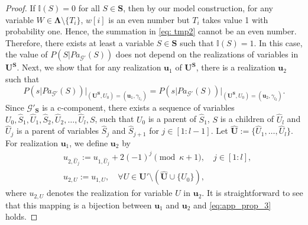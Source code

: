 \documentclass[accepted]{uai2022}
\newcommand{\Pa}[2]{\textit{Pa}_{#2}(#1)}
\newcommand{\U}[0]{\mathbf{U}}
\newcommand{\G}[0]{\mathcal{G}}
\begin{document}
\begin{proof}
        If $\mathbb{I}(S)=0$ for all $S \in \mathbf{S}$, then by our model construction, for any variable $W \in \mathbf{\Lambda}\setminus \{T_i\}$, $w[i]$ is an even number but $T_i$ takes value 1 with probability one. 
        Hence, the summation in \eqref{eq: tmp2} cannot be an even number.
        Therefore, there exists at least a variable $S\in \mathbf{S}$ such that $\mathbb{I}(S)=1$. 
        In this case, the value of $P(S|\Pa{S}{\G'})$ does not depend on the realizations of variables in $\U^{\mathbf{S}}$. 
        Next, we show that for any realization $\mathbf{u}_{1}$ of $\U^{\mathbf{S}}$, there is a realization $\mathbf{u}_{2}$ such that 
        \begin{equation}\label{eq:app_prop_3}
        P(s|\Pa{S}{\G'})\Big|_{(\U^{\mathbf{S}},U_0)=(\textbf{u}_1,\gamma_{l_1})}=P(s|\Pa{S}{\G'})\Big|_{(\U^{\mathbf{S}},U_0)=(\textbf{u}_2,\gamma_{l_2})}.
        \end{equation}
        Since $\G'_{\mathbf{S}}$ is a c-component, there exists a sequence of variables $U_0, \hat{S}_1, \hat{U}_1, \hat{S}_2, \hat{U}_2, \dots, \hat{U}_l, S$, such that $U_0$ is a parent of $\hat{S}_1$, $S$ is a children of $\hat{U}_l$ and $\hat{U}_j$ is a parent of variables $\hat{S}_j$ and $\hat{S}_{j+1}$ for $j \in [1:l-1]$. 
        Let $\hat{\U}:=\{\hat{U}_1, \dots, \hat{U}_l\}$. 
        For realization $\mathbf{u}_{1}$, we define $\mathbf{u}_{2}$ by
        \begin{equation}
            \begin{split}
                & u_{2,\hat{U}_j} := u_{1,\hat{U}_j} + 2(-1)^{j} \pmod{\kappa+1}, \quad j\in[1:l],\\
                & u_{2,U} := u_{1,U}, \quad \forall U\in \U' \setminus (\hat{\U}\cup \{U_0\}),
            \end{split}
        \end{equation}
        where $u_{2,U}$ denotes the realization for variable $U$ in $\textbf{u}_2$.
        It is straightforward to see that this mapping is a bijection between $\mathbf{u}_{1}$ and $\mathbf{u}_{2}$ and \eqref{eq:app_prop_3} holds.
        

\end{proof}
\end{document}

